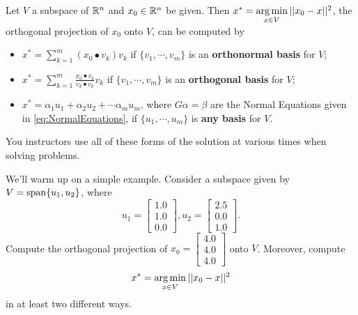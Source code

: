 \begin{tcolorbox}[title=\textbf{Computing the Solution Given by the Projection Theorem}]
Let $V$ a subspace of $\mathbb R^n$ and $x_0 \in \mathbb R^n$ be given. Then  $x^\ast = \operatorname*{arg\,min}\limits_{x \in V} || x_0 - x||^2$, the orthogonal projection of $x_0$ onto $V$, can be computed by
\begin{itemize}
\item $x^\ast = \sum_{k=1}^m \left(x_0 \bullet v_k \right) v_k $ if $\{ v_1, \cdots, v_m\}$ is an \textbf{orthonormal basis} for $V$; 
    \item $x^\ast = \sum_{k=1}^m \frac{x_0 \bullet v_k}{v_k \bullet v_k}v_k $  if $\{ v_1, \cdots, v_m\}$ is an \textbf{orthogonal basis} for $V$; 
    \item  $x^\ast = \alpha_1 u_1 + \alpha_2 u_2 + \cdots \alpha_m u_m $, where $G \alpha = \beta$ are the Normal Equations given in \eqref{eq:NormalEquations}, if $\{ u_1, \cdots, u_m\}$ is \textbf{any basis} for $V$.
\end{itemize}
\end{tcolorbox}

You instructors use all of these forms of the solution at various times when solving problems. 
\vspace*{0.2cm}

\begin{example}
\label{ex:OrthongoanlProjectionSimpleExample} 
We'll warm up on a simple example. Consider a subspace given by $V= \mathrm{span} \{ u_1, u_2 \}$, where
$$u_1=\left[ \begin{array}{r} 1.0 \\ 1.0 \\ 0.0 \end{array} \right], u_2=\left[ \begin{array}{r} 2.5 \\ 0.0 \\ 1.0 \end{array} \right]. $$
Compute the orthogonal projection of $x_0 = \left[ \begin{array}{r} 4.0 \\ 4.0 \\ 4.0 \end{array} \right]$ onto $V$. Moreover, compute
$$x^\ast = \operatorname*{arg\,min}\limits_{x \in V} || x_0 - x||^2  $$
in at least two different ways. 
\end{example}

